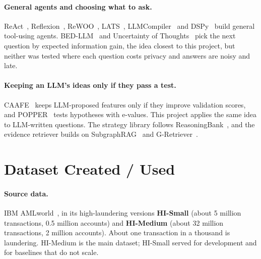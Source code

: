 \documentclass[11pt,a4paper]{article}
\begin{document}
\paragraph{General agents and choosing what to ask.} ReAct~\cite{yao2023}, Reflexion~\cite{shinn2023}, ReWOO~\cite{xu2023}, LATS~\cite{zhou2024}, LLMCompiler~\cite{kim2024} and DSPy~\cite{khattab2024} build general tool-using agents. BED-LLM~\cite{choudhury2025} and Uncertainty of Thoughts~\cite{hu2024uot} pick the next question by expected information gain, the idea closest to this project, but neither was tested where each question costs privacy and answers are noisy and late.

\paragraph{Keeping an LLM's ideas only if they pass a test.} CAAFE~\cite{hollmann2023} keeps LLM-proposed features only if they improve validation scores, and POPPER~\cite{huang2025} tests hypotheses with e-values. This project applies the same idea to LLM-written questions. The strategy library follows ReasoningBank~\cite{ouyang2026}, and the evidence retriever builds on SubgraphRAG~\cite{li2025} and G-Retriever~\cite{he2024}.

\section{Dataset Created / Used}

\paragraph{Source data.} IBM AMLworld~\cite{altman2023}, in its high-laundering versions \textbf{HI-Small} (about 5 million transactions, 0.5 million accounts) and \textbf{HI-Medium} (about 32 million transactions, 2 million accounts). About one transaction in a thousand is laundering. HI-Medium is the main dataset; HI-Small served for development and for baselines that do not scale.
\end{document}
